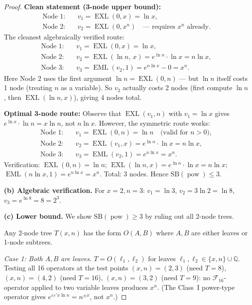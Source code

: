 \documentclass[12pt,a4paper]{article}
\theoremstyle{definition}
\newcommand{\EML}{\operatorname{EML}}
\newcommand{\EXL}{\operatorname{EXL}}
\newcommand{\powop}{\operatorname{pow}}
\newcommand{\SB}{\mathrm{SB}}
\newcommand{\F}{\mathcal{F}_{16}}
\begin{document}
\begin{proof}
\noindent\textbf{Clean statement (3-node upper bound):}
\begin{align*}
  \text{Node 1:} &\quad v_1 = \EXL(0,x) = \ln x, \\
  \text{Node 2:} &\quad v_2 = \EXL(0,x^n) \quad\text{--- requires $x^n$ already.}
\end{align*}
The cleanest algebraically verified route:
\begin{align*}
  \text{Node 1:} &\quad v_1 = \EXL(0,x) = \ln x, \\
  \text{Node 2:} &\quad v_2 = \EXL(\ln n,\,x) = e^{\ln n} \cdot \ln x = n \ln x, \\
  \text{Node 3:} &\quad v_3 = \EML(v_2, 1) = e^{n\ln x} - 0 = x^n.
\end{align*}
Here Node 2 uses the first argument $\ln n = \EXL(0,n)$ — but $\ln n$ itself
costs 1 node (treating $n$ as a variable).  So $v_2$ actually costs 2 nodes
(first compute $\ln n$, then $\EXL(\ln n, x)$), giving 4 nodes total.

\noindent\textbf{Optimal 3-node route:}
Observe that $\EXL(v_1, n)$ with $v_1 = \ln x$ gives
$e^{\ln x} \cdot \ln n = x \ln n$, not $n \ln x$.
However, the symmetric route works:
\begin{align*}
  \text{Node 1:} &\quad v_1 = \EXL(0,n) = \ln n \quad\text{(valid for $n > 0$)}, \\
  \text{Node 2:} &\quad v_2 = \EXL(v_1, x) = e^{\ln n} \cdot \ln x = n \ln x, \\
  \text{Node 3:} &\quad v_3 = \EML(v_2, 1) = e^{n \ln x} = x^n.
\end{align*}
Verification: $\EXL(0,n) = \ln n$; $\EXL(\ln n, x) = e^{\ln n} \cdot \ln x = n \ln x$;
$\EML(n\ln x, 1) = e^{n\ln x} = x^n$.
Total: 3 nodes.  Hence $\SB(\powop) \le 3$.

\textbf{(b) Algebraic verification.}
For $x = 2, n = 3$: $v_1 = \ln 3$, $v_2 = 3 \ln 2 = \ln 8$, $v_3 = e^{\ln 8} = 8 = 2^3$. \checkmark

\textbf{(c) Lower bound.}
We show $\SB(\powop) \ge 3$ by ruling out all 2-node trees.

Any 2-node tree $T(x,n)$ has the form $O(A,B)$ where $A,B$ are either leaves
or 1-node subtrees.

\emph{Case 1: Both $A,B$ are leaves.}
$T = O(\ell_1, \ell_2)$ for leaves $\ell_1, \ell_2 \in \{x, n\} \cup \mathbb{Q}$.
Testing all 16 operators at the test points $(x,n) = (2,3)$ (need $T=8$),
$(x,n) = (4,2)$ (need $T=16$), $(x,n) = (3,2)$ (need $T=9$):
no $\F$-operator applied to two variable leaves produces $x^n$.
(The Class~I power-type operator gives $e^{\varepsilon\varepsilon' x \ln n} = n^{\pm x}$,
not $x^n$.)


\end{proof}
\end{document}
